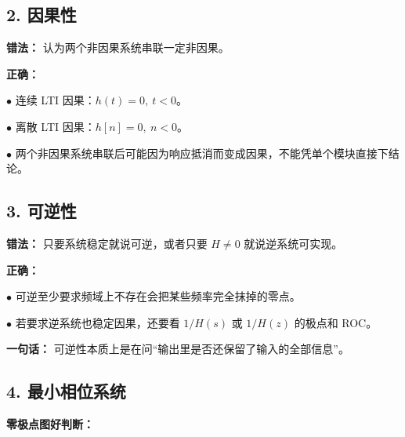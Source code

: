 \documentclass[11pt]{ctexart}
\begin{document}
\subsection*{2. 因果性}



\textbf{错法：} 认为两个非因果系统串联一定非因果。\par



\textbf{正确：}\par



\noindent\(\bullet\) 连续 LTI 因果：\(h(t)=0,\ t<0\)。\par

\noindent\(\bullet\) 离散 LTI 因果：\(h[n]=0,\ n<0\)。\par

\noindent\(\bullet\) 两个非因果系统串联后可能因为响应抵消而变成因果，不能凭单个模块直接下结论。\par



\subsection*{3. 可逆性}



\textbf{错法：} 只要系统稳定就说可逆，或者只要 \(H\neq 0\) 就说逆系统可实现。\par



\textbf{正确：}\par



\noindent\(\bullet\) 可逆至少要求频域上不存在会把某些频率完全抹掉的零点。\par

\noindent\(\bullet\) 若要求逆系统也稳定因果，还要看 \(1/H(s)\) 或 \(1/H(z)\) 的极点和 ROC。\par



\textbf{一句话：} 可逆性本质上是在问“输出里是否还保留了输入的全部信息”。\par



\subsection*{4. 最小相位系统}



\textbf{零极点图好判断：}\par
\end{document}
